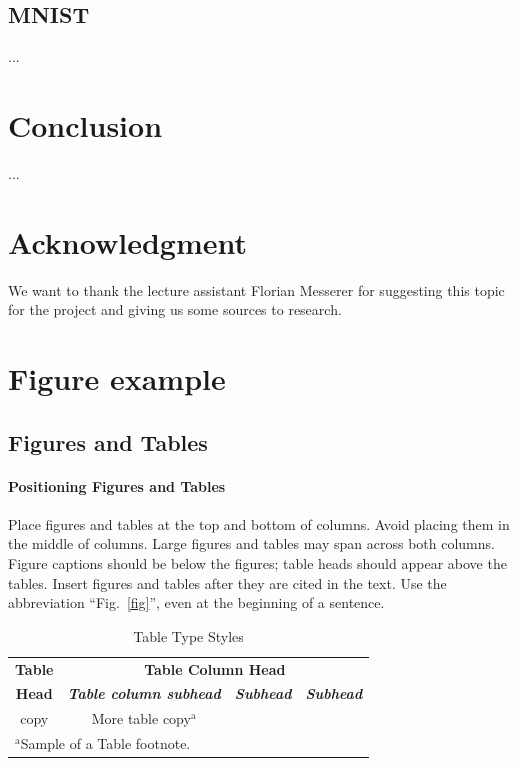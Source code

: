 \documentclass[conference]{IEEEtran}
\begin{document}
\subsection{MNIST}
...

\section{Conclusion}
...

\section*{Acknowledgment}
We want to thank the lecture assistant Florian Messerer for suggesting this topic for the project and giving us some sources to research. 

\section{Figure example}
\subsection{Figures and Tables}
\paragraph{Positioning Figures and Tables} Place figures and tables at the top and 
bottom of columns. Avoid placing them in the middle of columns. Large 
figures and tables may span across both columns. Figure captions should be 
below the figures; table heads should appear above the tables. Insert 
figures and tables after they are cited in the text. Use the abbreviation 
``Fig.~\ref{fig}'', even at the beginning of a sentence.

\begin{table}[htbp]
	\caption{Table Type Styles}
	\begin{center}
		\begin{tabular}{|c|c|c|c|}
			\hline
			\textbf{Table}&\multicolumn{3}{|c|}{\textbf{Table Column Head}} \\
			\cline{2-4} 
			\textbf{Head} & \textbf{\textit{Table column subhead}}& \textbf{\textit{Subhead}}& \textbf{\textit{Subhead}} \\
			\hline
			copy& More table copy$^{\mathrm{a}}$& &  \\
			\hline
			\multicolumn{4}{l}{$^{\mathrm{a}}$Sample of a Table footnote.}
		\end{tabular}
		\label{tab1}
	\end{center}
\end{table}
\end{document}
